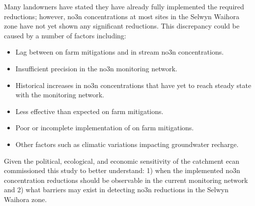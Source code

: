 Many landowners have stated they have already fully implemented the required reductions;
however, \gls{no3n} concentrations at most sites in the Selwyn Waihora zone have not yet shown any significant reductions\citep{scottpc}.
This discrepancy could be caused by a number of factors including:
\begin{itemize}
    \item Lag between on farm mitigations and in stream \gls{no3n} concentrations.
    \item Insufficient precision in the \gls{no3n} monitoring network.
    \item Historical increases in \gls{no3n} concentrations that have yet to reach steady state with the monitoring network.
    \item Less effective than expected on farm mitigations.
    \item Poor or incomplete implementation of on farm mitigations.
    \item Other factors such as climatic variations impacting groundwater recharge.
\end{itemize}
Given the political, ecological, and economic sensitivity of the catchment \gls{ecan} commissioned this study to better understand: 1) when the implemented \gls{no3n} concentration reductions should be observable in the current monitoring network and 2) what barriers may exist in detecting \gls{no3n} reductions in the Selwyn Waihora zone.
